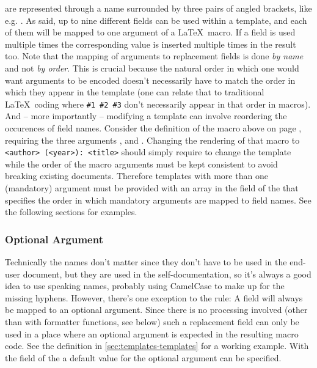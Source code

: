\documentclass[12pt]{scrartcl}
\begin{document}
 are represented through a name
surrounded by three pairs of angled brackets, like e.g. . As
said, up to nine different fields can be used within a template, and each of
them will be mapped to one argument of a \LaTeX\ macro.  If a field is used
multiple times the corresponding value is inserted multiple times in the result
too. Note that the mapping of arguments to replacement fields is done \emph{by
name} and not \emph{by order}.  This is crucial because the natural order in
which one would want arguments to be encoded doesn't necessarily have to match
the order in which they appear in the template (one can relate that to
traditional \LaTeX\ coding where \texttt{\#1 \#2 \#3} don't necessarily appear
in that order in macros). And -- more importantly -- modifying a template can
involve reordering the occurences of field names. Consider the definition of the
 macro above on page \pageref{fig:bookShort}, requiring the three
arguments ,  and .  Changing the
rendering of that macro to \texttt{<author> (<year>): <title>} should simply
require to change the template while the order of the macro arguments must be
kept consistent to avoid breaking existing documents.  Therefore templates with
more than one (mandatory) argument must be provided with an array in the
 field of the  that specifies the order
in which mandatory arguments are mapped to field names.  See the following
sections for examples.


\subsubsection{Optional Argument}
\label{sec:defining:templates-optional-argument}

Technically the names don't matter since they don't have to be used in the
end-user document, but they are used in the self-documentation, so it's always a
good idea to use speaking names, probably using CamelCase to make up for the
missing hyphens.  However, there's one exception to the rule: A field
 will always be mapped to an optional argument.  Since
there is no processing involved (other than with formatter functions, see below)
such a replacement field can only be used in a place where an optional argument
is expected in the resulting macro code.  See the  definition in
\vref{sec:templates-templates} for a working example.  With the 
field of the  a default value for the optional
argument can be specified.
\end{document}
